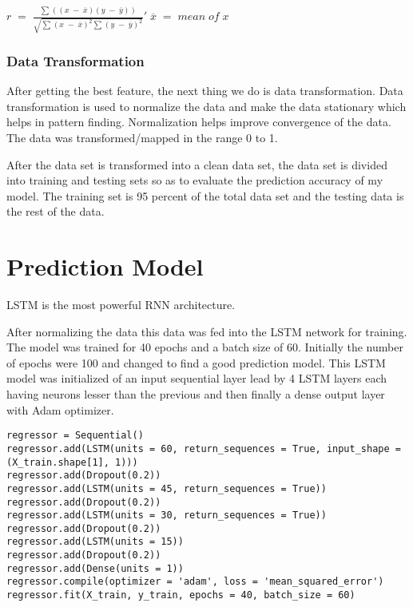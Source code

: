 \documentclass[5p,,preprint,12pt,twocolumn]{elsarticle}
\begin{document}
$r\;=\;\frac{\sum_{}((x\;-\;\overline x)(y\;-\;\overline y))}{\sqrt{{\displaystyle\sum_{}}(x\;-\;\overline x)^{2}{\displaystyle\sum_{}}(y\;-\;\overline y)^{2}}}'\;\overline x\;=\;mean\;of\;x $





\subsubsection{Data Transformation}After getting the best feature, the next thing we do is data transformation. Data transformation is used to normalize the data and make the data stationary which helps in pattern finding. Normalization helps improve convergence of the data. The data was transformed/mapped in the range 0 to 1.

After the data set is transformed into a clean data set, the data set is divided into training and testing sets so as to evaluate the prediction accuracy of my model. The training set is 95 percent of the total data set and the testing data is the rest of the data.
    
\section{Prediction Model}
LSTM is the most powerful RNN architecture. 

After normalizing the data this data was fed into the LSTM network for training. The model was trained for 40 epochs and a batch size of 60. Initially the number of epochs were 100 and changed to find a good prediction model. This LSTM model was initialized of an input sequential layer lead by 4 LSTM layers each having neurons lesser than the previous and then finally a dense output layer with Adam optimizer.


\begin{lstlisting}[style=listing_style,caption={Code for LSTM Neural Network}]
regressor = Sequential()
regressor.add(LSTM(units = 60, return_sequences = True, input_shape = (X_train.shape[1], 1)))
regressor.add(Dropout(0.2))
regressor.add(LSTM(units = 45, return_sequences = True))
regressor.add(Dropout(0.2))
regressor.add(LSTM(units = 30, return_sequences = True))
regressor.add(Dropout(0.2))
regressor.add(LSTM(units = 15))
regressor.add(Dropout(0.2))
regressor.add(Dense(units = 1)) 
regressor.compile(optimizer = 'adam', loss = 'mean_squared_error')
regressor.fit(X_train, y_train, epochs = 40, batch_size = 60)

\end{lstlisting}
\end{document}
